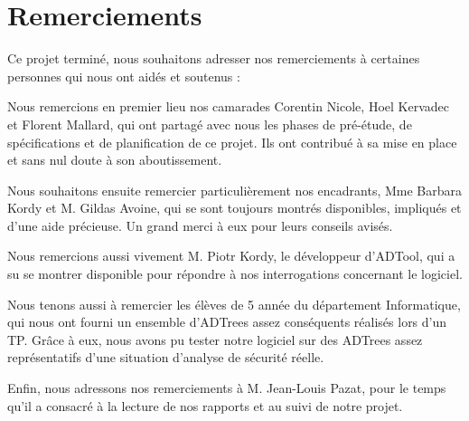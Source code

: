 \section{Remerciements}

Ce projet terminé, nous souhaitons adresser nos remerciements à certaines personnes qui nous ont aidés et soutenus :   

Nous remercions en premier lieu nos camarades Corentin {\sc Nicole}, Hoel {\sc Kervadec} et Florent {\sc Mallard}, qui ont partagé avec nous les phases de pré-étude, de spécifications et de planification de ce projet. Ils ont contribué à sa mise en place et sans nul doute à son aboutissement.

Nous souhaitons ensuite remercier particulièrement nos encadrants, Mme Barbara {\sc Kordy} et M. Gildas {\sc Avoine}, qui se sont toujours montrés disponibles, impliqués et d'une aide précieuse. Un grand merci à eux pour leurs conseils avisés.

Nous remercions aussi vivement M. Piotr {\sc Kordy}, le développeur d'ADTool, qui a su se montrer disponible pour répondre à nos interrogations concernant le logiciel.

Nous tenons aussi à remercier les élèves de 5\ieme{} année du département Informatique, qui nous ont fourni un ensemble d'ADTrees assez conséquents réalisés lors d'un TP. Grâce à eux, nous avons pu tester notre logiciel sur des ADTrees assez représentatifs d'une situation d'analyse de sécurité réelle.

Enfin, nous adressons nos remerciements à M. Jean-Louis {\sc Pazat}, pour le temps qu'il a consacré à la lecture de nos rapports et au suivi de notre projet.